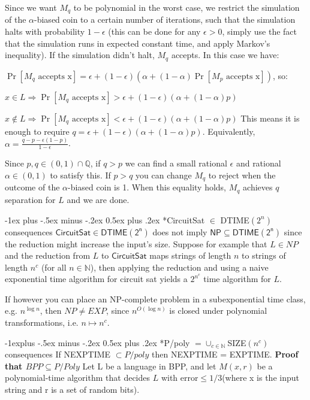 \documentclass[10pt,landscape]{article}
\makeatletter
\theoremstyle{plain}%
\theoremstyle{definition}
\theoremstyle{remark}
\renewcommand{\section}{\@startsection{section}{1}{0mm}%
                                {-1ex plus -.5ex minus -.2ex}%
                                {0.5ex plus .2ex}%
                                {\normalfont\large\bfseries}}
\renewcommand{\subsection}{\@startsection{subsection}{2}{0mm}%
                                {-1explus -.5ex minus -.2ex}%
                                {0.5ex plus .2ex}%
                                {\normalfont\normalsize\bfseries}}
\makeatother
\begin{document}
\begin{multicols}{3}
Since we want $M_q$ to be polynomial in the worst case, we restrict the simulation of the $\alpha$-biased coin to a certain number of iterations, such that the simulation halts with probability $1-\epsilon$ (this can be done for any $\epsilon>0$, simply use the fact that the simulation runs in expected constant time, and apply Markov's inequality). If the simulation didn't halt, $M_q$ accepts. In this case we have:

$\Pr\left[\text{$M_q$ accepts x}\right]=\epsilon+(1-\epsilon)\left(\alpha+(1-\alpha)\Pr\left[\text{$M_p$ accepts x}\right]\right)$, so:

$x\in L \Rightarrow \Pr\left[\text{$M_q$ accepts x}\right]>
\epsilon+(1-\epsilon)\left(\alpha+(1-\alpha)p\right)
$

$x\notin L \Rightarrow \Pr\left[\text{$M_q$ accepts x}\right]<
\epsilon+(1-\epsilon)\left(\alpha+(1-\alpha)p\right)
$
This means it is enough to require $q=\epsilon+(1-\epsilon)\left(\alpha+(1-\alpha)p\right)$. Equivalently, 
$\alpha=\frac{q-p-\epsilon(1-p)}{1-\epsilon}$.

Since $p,q\in (0,1)\cap \mathbb{Q}$, if $q>p$ we can find a small rational $\epsilon$ and rational $\alpha\in (0,1)$ to satisfy this. If $p>q$ you can change $M_q$ to reject when the outcome of the $\alpha$-biased coin is 1. When this equality holds, $M_q$ achieves $q$ separation for $L$ and we are done.

\section*{CircuitSat $\in$ DTIME$(2^n)$ consequences}
$\mathsf{CircuitSat\in DTIME(2^n)}$ does not imply $\mathsf{NP\subseteq DTIME(2^n)}$ since the reduction might increase the input's size. Suppose for example that $L\in NP$ and the reduction from $L$ to $\mathsf{CircuitSat}$ maps strings of length $n$ to strings of length $n^c$ (for all $n\in\mathbb{N}$), then applying the reduction and using a naive exponential time algorithm for circuit sat yields a $2^{n^c}$ time algorithm for $L$.

If however you can place an NP-complete problem in a subexponential time class, e.g. $n^{\log n}$, then $NP\neq EXP$, since $n^{O(\log n)}$ is closed under polynomial transformations, i.e. $n\mapsto n^c$.

\subsection*{P/poly $= \cup_{c\in\mathbb{N}}
 $SIZE$(n^c)$ consequences}
 If NEXPTIME $\subset P/poly$ then NEXPTIME = EXPTIME.
 \textbf{Proof that $BPP \subseteq P/Poly$ }
Let L be a language in BPP, and let $M(x,r)$ be a polynomial-time algorithm that decides $L$ with error$\le 1/3$(where x is the input string and r is a set of random bits).


\end{multicols}
\end{document}
